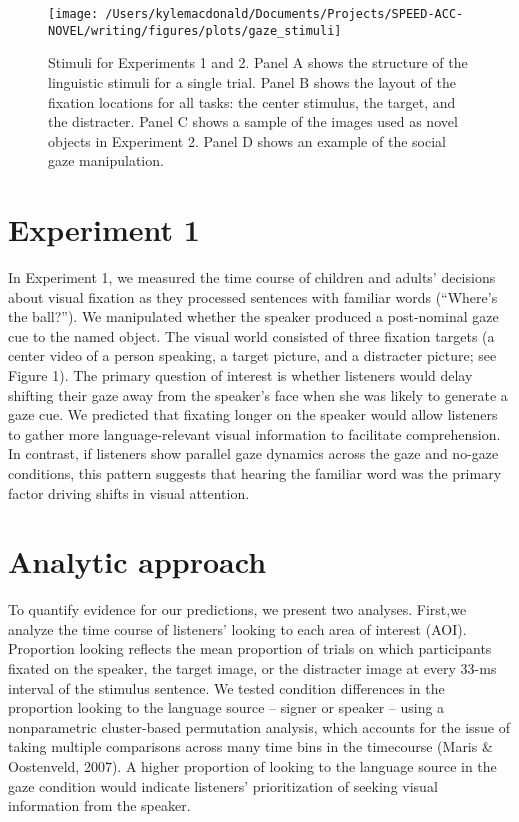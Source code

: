 \documentclass[10pt, letterpaper]{article}
\newenvironment{CodeChunk}{}{}
\begin{document}
\begin{CodeChunk}
\begin{figure*}[h]

{\centering \texttt{[image: /Users/kylemacdonald/Documents/Projects/SPEED-ACC-NOVEL/writing/figures/plots/gaze\_stimuli]} 

}

\caption[Stimuli for Experiments 1 and 2]{Stimuli for Experiments 1 and 2. Panel A shows the structure of the linguistic stimuli for a single trial. Panel B shows the layout of the fixation locations for all tasks: the center stimulus, the target, and the distracter. Panel C shows a sample of the images used as novel objects in Experiment 2. Panel D shows an example of the social gaze manipulation.}\label{fig:gaze-stimuli}
\end{figure*}
\end{CodeChunk}

\hypertarget{experiment-1}{%
\section{Experiment 1}\label{experiment-1}}

In Experiment 1, we measured the time course of children and adults'
decisions about visual fixation as they processed sentences with
familiar words (``Where's the ball?''). We manipulated whether the
speaker produced a post-nominal gaze cue to the named object. The visual
world consisted of three fixation targets (a center video of a person
speaking, a target picture, and a distracter picture; see Figure 1). The
primary question of interest is whether listeners would delay shifting
their gaze away from the speaker's face when she was likely to generate
a gaze cue. We predicted that fixating longer on the speaker would allow
listeners to gather more language-relevant visual information to
facilitate comprehension. In contrast, if listeners show parallel gaze
dynamics across the gaze and no-gaze conditions, this pattern suggests
that hearing the familiar word was the primary factor driving shifts in
visual attention.

\hypertarget{analytic-approach}{%
\section{Analytic approach}\label{analytic-approach}}

To quantify evidence for our predictions, we present two analyses.
First,we analyze the time course of listeners' looking to each area of
interest (AOI). Proportion looking reflects the mean proportion of
trials on which participants fixated on the speaker, the target image,
or the distracter image at every 33-ms interval of the stimulus
sentence. We tested condition differences in the proportion looking to
the language source -- signer or speaker -- using a nonparametric
cluster-based permutation analysis, which accounts for the issue of
taking multiple comparisons across many time bins in the timecourse
(Maris \& Oostenveld, 2007). A higher proportion of looking to the
language source in the gaze condition would indicate listeners'
prioritization of seeking visual information from the speaker.
\end{document}

